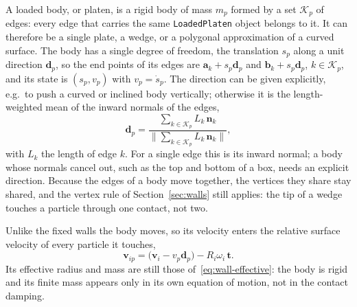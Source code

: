 A loaded body, or platen, is a rigid body of mass $m_{p}$ formed by a set
$\mathcal{K}_{p}$ of edges: every edge that carries the same
\texttt{LoadedPlaten} object belongs to it.  It can therefore be a single plate,
a wedge, or a polygonal approximation of a curved surface.  The body has a
single degree of freedom, the translation $s_{p}$ along a unit direction
$\mathbf{d}_{p}$, so the end points of its edges are
$\mathbf{a}_{k}+s_{p}\mathbf{d}_{p}$ and $\mathbf{b}_{k}+s_{p}\mathbf{d}_{p}$,
$k\in\mathcal{K}_{p}$, and its state is $(s_{p},v_{p})$ with $v_{p}=\dot s_{p}$.
The direction can be given explicitly, e.g.\ to push a curved or inclined body
vertically; otherwise it is the length-weighted mean of the inward normals of
the edges,
\begin{equation}
  \mathbf{d}_{p} = \frac{\sum_{k\in\mathcal{K}_{p}} L_{k}\,\mathbf{n}_{k}}
                        {\bigl\lVert\sum_{k\in\mathcal{K}_{p}} L_{k}\,\mathbf{n}_{k}\bigr\rVert},
  \label{eq:platen-direction}
\end{equation}
with $L_{k}$ the length of edge $k$.  For a single edge this is its inward
normal; a body whose normals cancel out, such as the top and bottom of a box,
needs an explicit direction.  Because the edges of a body move together, the
vertices they share stay shared, and the vertex rule of
Section~\ref{sec:walls} still applies: the tip of a wedge touches a particle
through one contact, not two.

Unlike the fixed walls the body moves, so its velocity enters the relative
surface velocity of every particle it touches,
\begin{equation}
  \mathbf{v}_{ip} = \bigl(\mathbf{v}_{i}-v_{p}\mathbf{d}_{p}\bigr)
                    - R_{i}\omega_{i}\,\mathbf{t}.
  \label{eq:vrel-platen}
\end{equation}
Its effective radius and mass are still those of~\eqref{eq:wall-effective}: the
body is rigid and its finite mass appears only in its own equation of motion,
not in the contact damping.

